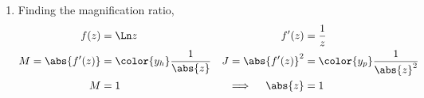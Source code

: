 \begin{enumerate}
    \item Finding the magnification ratio,
          \begin{align}
              f(z)                   & = \Ln z                           &
              f'(z)                  & = \frac{1}{z}                       \\
              M = \abs{f'(z)}        & = \color{y_h} \frac{1}{\abs{z}}   &
              J = \abs{f'(z)}^2      & = \color{y_p} \frac{1}{\abs{z}^2}   \\
              M                      & = 1                               &
              \implies \quad \abs{z} & = 1
          \end{align}
\end{enumerate}
